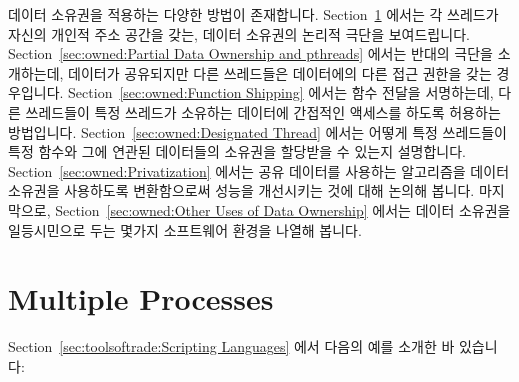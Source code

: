 데이터 소유권을 적용하는 다양한 방법이 존재합니다.
Section~\ref{sec:owned:Multiple Processes} 에서는 각 쓰레드가 자신의 개인적
주소 공간을 갖는, 데이터 소유권의 논리적 극단을 보여드립니다.
Section~\ref{sec:owned:Partial Data Ownership and pthreads} 에서는 반대의
극단을 소개하는데, 데이터가 공유되지만 다른 쓰레드들은 데이터에의 다른 접근
권한을 갖는 경우입니다.
Section~\ref{sec:owned:Function Shipping} 에서는 함수 전달을 서명하는데, 다른
쓰레드들이 특정 쓰레드가 소유하는 데이터에 간접적인 액세스를 하도록 허용하는
방법입니다.
Section~\ref{sec:owned:Designated Thread} 에서는 어떻게 특정 쓰레드들이 특정
함수와 그에 연관된 데이터들의 소유권을 할당받을 수 있는지 설명합니다.
Section~\ref{sec:owned:Privatization} 에서는 공유 데이터를 사용하는 알고리즘을
데이터 소유권을 사용하도록 변환함으로써 성능을 개선시키는 것에 대해 논의해
봅니다.
마지막으로, Section~\ref{sec:owned:Other Uses of Data Ownership} 에서는 데이터
소유권을 일등시민으로 두는 몇가지 소프트웨어 환경을 나열해 봅니다.
\iffalse

There are a number of approaches to data ownership.
Section~\ref{sec:owned:Multiple Processes} presents the logical extreme
in data ownership, where each thread has its own private address space.
Section~\ref{sec:owned:Partial Data Ownership and pthreads} looks at
the opposite extreme, where the data is shared, but different threads
own different access rights to the data.
Section~\ref{sec:owned:Function Shipping} describes function shipping,
which is a way of allowing other threads to have indirect access to
data owned by a particular thread.
Section~\ref{sec:owned:Designated Thread} describes how designated
threads can be assigned ownership of a specified function and the
related data.
Section~\ref{sec:owned:Privatization} discusses improving performance
by transforming algorithms with shared data to instead use data ownership.
Finally, Section~\ref{sec:owned:Other Uses of Data Ownership} lists
a few software environments that feature data ownership as a
first-class citizen.
\fi

\section{Multiple Processes}
\label{sec:owned:Multiple Processes}

Section~\ref{sec:toolsoftrade:Scripting Languages}
에서 다음의 예를 소개한 바 있습니다:
\iffalse

Section~\ref{sec:toolsoftrade:Scripting Languages}
introduced the following example:
\fi

